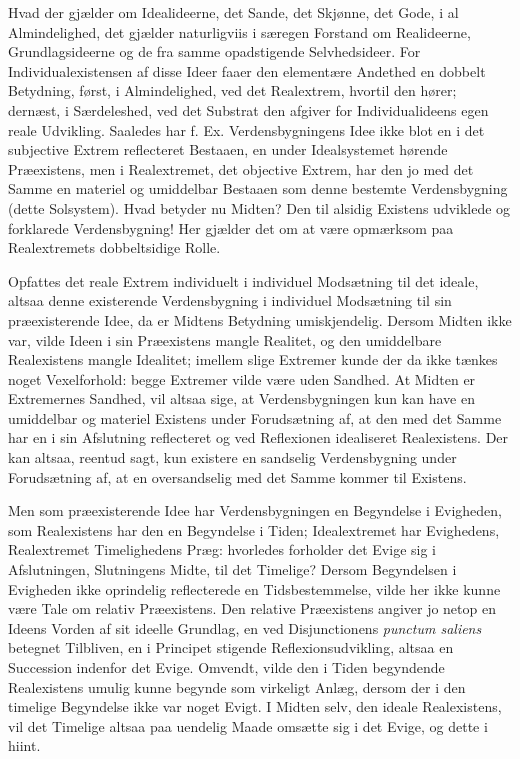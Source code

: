 \documentclass[12pt]{book}
\newcommand{\opage}[1]{\marginnote{\footnotesize\textit{[#1]}}}
\begin{document}
Hvad der gjælder om Idealideerne, det Sande, det Skjønne, det Gode, i al Almindelighed, det gjælder naturligviis i særegen Forstand om Realideerne, Grundlagsideerne og de fra samme opadstigende Selvhedsideer. For Individualexistensen af disse Ideer faaer den elementære Andethed en dobbelt Betydning, først, i Almindelighed, ved det Realextrem, hvortil den hører; dernæst, i Særdeleshed, ved det Substrat den afgiver for Individualideens egen reale Udvikling. Saaledes har f. Ex. Verdensbygningens Idee ikke blot en i det subjective Extrem reflecteret Bestaaen, en under Idealsystemet hørende Præexistens, men i Realextremet, det objective Extrem, har den jo med det Samme en materiel og umiddelbar Bestaaen som denne bestemte Verdensbygning (dette Solsystem). Hvad betyder nu Midten? Den til alsidig Existens udviklede og forklarede Verdensbygning! Her gjælder det om at være opmærksom paa Realextremets dobbeltsidige Rolle.

Opfattes det reale Extrem individuelt i individuel Modsætning til det ideale, altsaa denne existerende Verdensbygning i individuel Modsætning til sin præexisterende Idee, da er Midtens Betydning umiskjendelig. Dersom Midten ikke var,
\opage{463}vilde Ideen i sin Præexistens mangle Realitet, og den umiddelbare Realexistens mangle Idealitet; imellem slige Extremer kunde der da ikke tænkes noget Vexelforhold: begge Extremer vilde være uden Sandhed. At Midten er Extremernes Sandhed, vil altsaa sige, at Verdensbygningen kun kan have en umiddelbar og materiel Existens under Forudsætning af, at den med det Samme har en i sin Afslutning reflecteret og ved Reflexionen idealiseret Realexistens. Der kan altsaa, reentud sagt, kun existere en sandselig Verdensbygning under Forudsætning af, at en oversandselig med det Samme kommer til Existens.

Men som præexisterende Idee har Verdensbygningen en Begyndelse i Evigheden, som Realexistens har den en Begyndelse i Tiden; Idealextremet har Evighedens, Realextremet Timelighedens Præg: hvorledes forholder det Evige sig i Afslutningen, Slutningens Midte, til det Timelige? Dersom Begyndelsen i Evigheden ikke oprindelig reflecterede en Tidsbestemmelse, vilde her ikke kunne være Tale om relativ Præexistens. Den relative Præexistens angiver jo netop en Ideens Vorden af sit ideelle Grundlag, en ved Disjunctionens \textit{punctum saliens} betegnet Tilbliven, en i Principet stigende Reflexionsudvikling, altsaa en Succession indenfor det Evige. Omvendt, vilde den i Tiden begyndende Realexistens umulig kunne begynde som virkeligt Anlæg, dersom der i den timelige Begyndelse ikke var noget Evigt. I Midten selv, den ideale Realexistens, vil det Timelige altsaa paa uendelig Maade omsætte sig i det Evige, og dette i hiint.
\end{document}
